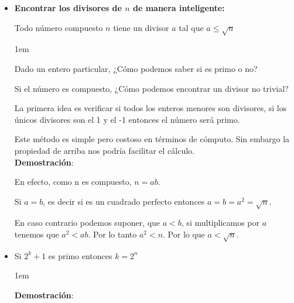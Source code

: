 \documentclass[12pt, fleqn]{report}                             %
\newenvironment{SmallIndentation}[1][0.75em]                    %
    {\begin{adjustwidth}{#1}{}\begin{footnotesize}}                 %
    {\end{footnotesize}\end{adjustwidth}}                           %
\begin{document}
\begin{itemize}
\begin{SmallIndentation}[1em]
                    Y bingo, ahí esta una lista de números consecutivos compuestos.

                \end{SmallIndentation}


            \item \textbf{Encontrar los divisores de $n$ de manera inteligente: }

                Todo número compuesto $n$ tiene un divisor $a$ tal que $a \leq \sqrt{n}$

                    \begin{SmallIndentation}[1em]

                        Dado un entero particular, ¿Cómo podemos saber si es primo o no?

                        Si el número es compuesto, ¿Cómo podemos encontrar un divisor no trivial?

                        La primera idea es verificar si todos los enteros menores son
                        divisores, si los únicos divisores son el 1 y el -1 entonces
                        el número será primo.

                        Este método es simple pero costoso en términos de cómputo. Sin
                        embargo la propiedad de arriba nos podría facilitar el cálculo.\\

                        \textbf{Demostración}:

                        En efecto, como n es compuesto, $n = ab$.

                        Si $a = b$, es decir si es un cuadrado perfecto entonces
                        $a = b = a^2 = \sqrt{n}$.

                        En caso contrario podemos suponer, que $a<b$, si multiplicamos
                        por $a$ tenemos que $a^2<ab$. Por lo tanto $a^2 < n$.
                        Por lo que $a < \sqrt{n}$.

                    \end{SmallIndentation}


                \item Si $2^k+1$ es primo entonces $k = 2^n$

                    \begin{SmallIndentation}[1em]

                        \textbf{Demostración}:


\end{SmallIndentation}
\end{itemize}
\end{document}
